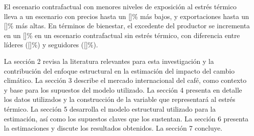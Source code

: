 El escenario contrafactual con menores niveles de exposición al estrés térmico lleva a un escenario con precios hasta un []\% más bajos, y exportaciones hasta un []\% más altas. En términos de bienestar, el excedente del productor se incrementa en un []\% en un escenario contrafactual sin estrés térmico, con diferencia entre líderes ([]\%) y seguidores ([]\%).

La sección 2 revisa la literatura relevantes para esta investigación y la contribución del enfoque estructural en la estimación del impacto del cambio climático. La sección 3 describe el mercado internacional del café, como contexto y base para los supuestos del modelo utilizado. La sección 4 presenta en detalle los datos utilizados y la construcción de la variable que representará al estrés térmico. La sección 5 desarrolla el modelo estructural utilizado para la estimación, así como los supuestos claves que los sustentan. La sección 6 presenta la estimaciones y discute los resultados obtenidos. La sección 7 concluye.